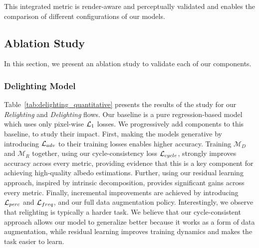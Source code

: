 This integrated metric is render-aware and perceptually validated and enables the comparison of different configurations of our models. 

\subsection{\textbf{Ablation Study}}

In this section, we present an ablation study to validate each of our components.

\subsubsection*{\textbf{Delighting Model}} %
Table~\ref{tab:delighting_quantitative} presents the results of the study for our \textit{Relighting} and \textit{Delighting} flows. 
Our baseline is a pure regression-based model which uses only pixel-wise $\mathcal{L}_1$ losses. We progressively add components to this baseline, to study their impact.
First, making the models generative by introducing $\mathcal{L}_{adv}$ to their training losses enables higher accuracy.
Training $\mathcal{M}_D$ and $\mathcal{M}_R$ together, using our cycle-consistency loss $\mathcal{L}_{cycle}$, strongly improves accuracy across every metric, providing evidence that this is a key component for achieving high-quality albedo estimations. 
Further, using our residual learning approach, inspired by intrinsic decomposition, provides significant gains across every metric.
Finally, incremental improvements are achieved by introducing $\mathcal{L}_{perc}$ and $\mathcal{L}_{freq}$, and our full data augmentation policy. Interestingly, we observe that relighting is typically a harder task.
We believe that our cycle-consistent approach allows our model to generalize better because it works as a form of data augmentation, while residual learning improves training dynamics and makes the task easier to learn. 







